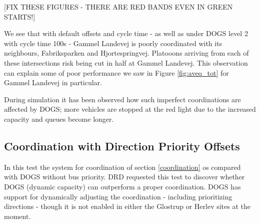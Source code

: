 [FIX THESE FIGURES - THERE ARE RED BANDS EVEN IN GREEN STARTS!]

We see that with default offsets and cycle time - as well as under DOGS level 2 with cycle time 100s - Gammel Landevej is poorly coordinated with its neighbours, Fabriksparken and Hjortespringvej. Platooons arriving from each of these intersections risk being cut in half at Gammel Landevej. This observation can explain some of poor performance we saw in Figure \ref{fig:aveq_tot} for Gammel Landevej in particular.

During simulation it has been observed how such imperfect coordinations are affected by DOGS; more vehicles are stopped at the red light due to the increased capacity and queues become longer.

\subsection{Coordination with Direction Priority Offsets}
In this test the system for coordination of section \ref{coordination} os compared with DOGS without bus priority. DRD requested this test to discover whether DOGS (dynamic capacity) can outperform a proper coordination. DOGS has support for dynamically adjusting the coordination - including prioritizing directions - though it is not enabled in either the Glostrup or Herlev sites at the moment.

